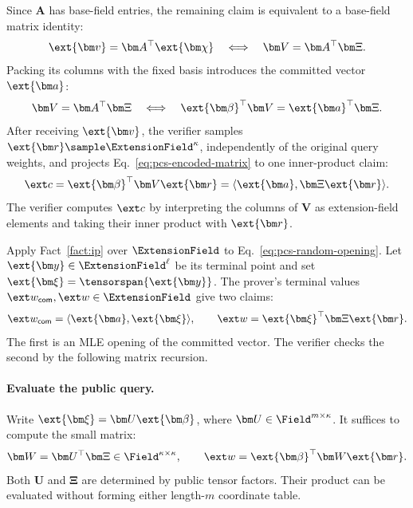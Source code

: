 Since \(\bm A\) has base-field entries, the remaining claim is
equivalent to a base-field matrix identity:
\[
    \ext{\bm v}=\bm A^\top\ext{\bm\chi}
    \quad\Longleftrightarrow\quad
    \bm V=\bm A^\top\bm\Xi.
\]
Packing its columns with the fixed basis introduces the committed
vector \(\ext{\bm a}\):
\begin{equation}
    \bm V=\bm A^\top\bm\Xi
    \quad\Longleftrightarrow\quad
    \ext{\bm\beta}^{\top}\bm V
    =\ext{\bm a}^{\top}\bm\Xi.
\label{eq:pcs-encoded-matrix}
\end{equation}
After receiving \(\ext{\bm v}\), the verifier samples
\(\ext{\bm r}\sample\ExtensionField^\kappa\), independently of
the original query weights, and projects
Eq.~\eqref{eq:pcs-encoded-matrix} to one inner-product claim:
\begin{equation}
    \ext c
    =\ext{\bm\beta}^{\top}\bm V\ext{\bm r}
    =\langle\ext{\bm a},\bm\Xi\ext{\bm r}\rangle.
\label{eq:pcs-random-opening}
\end{equation}
The verifier computes \(\ext c\) by interpreting the columns of
\(\bm V\) as extension-field elements and taking their inner
product with \(\ext{\bm r}\).

Apply Fact~\ref{fact:ip} over \(\ExtensionField\) to
Eq.~\eqref{eq:pcs-random-opening}.
Let \(\ext{\bm y}\in\ExtensionField^\ell\) be its terminal point
and set \(\ext{\bm\xi}=\tensorspan{\ext{\bm y}}\).
The prover's terminal values
\(\ext w_{\mathsf{com}},\ext w\in\ExtensionField\) give two claims:
\begin{equation}
    \ext w_{\mathsf{com}}
    =\langle\ext{\bm a},\ext{\bm\xi}\rangle,
    \qquad
    \ext w=\ext{\bm\xi}^{\top}\bm\Xi\ext{\bm r}.
\label{eq:pcs-terminal-claims}
\end{equation}
The first is an MLE opening of the committed vector.
The verifier checks the second by the following matrix recursion.

\paragraph{Evaluate the public query.}
Write \(\ext{\bm\xi}=\bm U\ext{\bm\beta}\), where
\(\bm U\in\Field^{m\times\kappa}\).
It suffices to compute the small matrix:
\begin{equation}
    \bm W=\bm U^\top\bm\Xi\in\Field^{\kappa\times\kappa},
    \qquad
    \ext w=\ext{\bm\beta}^{\top}\bm W\ext{\bm r}.
\label{eq:pcs-query-matrix}
\end{equation}
Both \(\bm U\) and \(\bm\Xi\) are determined by public tensor
factors. Their product can be evaluated without forming either
length-\(m\) coordinate table.

